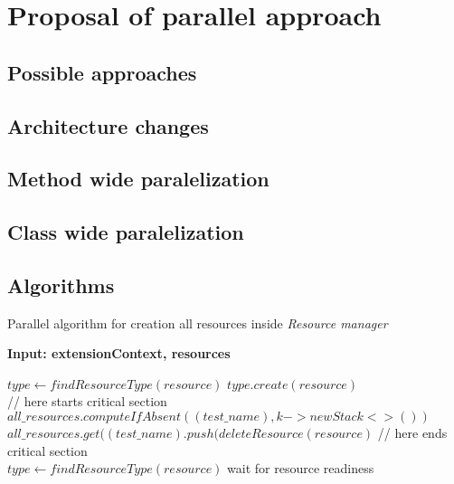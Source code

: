 \chapter{Proposal of parallel approach}


\section{Possible approaches}
\section{Architecture changes} %
\section{Method wide paralelization}
\section{Class wide paralelization}
\section{Algorithms} 

\begin{algorithm}[H]
\label{01:alg:dsdsd}
\caption{Parallel algorithm for creation all resources inside \emph{Resource manager}}

\hspace*{\algorithmicindent} \textbf{Input: extensionContext, resources}

    \begin{algorithmic}[1]
            \State $type \gets findResourceType(resource)$
            \State $type.create(resource)$
            \\
            \State // here starts critical section
            \State $all\_resources.computeIfAbsent((test\_name), k -> new Stack<>())$
            \State $all\_resources.get((test\_name).push(deleteResource(resource)$
            \State // here ends critical section
            \\
                \State $type \gets findResourceType(resource)$
                \State wait for resource readiness
            \EndForEach
        \EndIf
        \EndForEach
    \end{algorithmic}
\end{algorithm}

